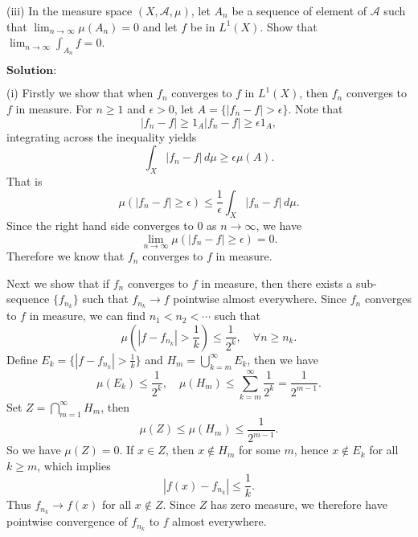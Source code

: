 \documentclass[12pt,a4paper]{ctexart}
\begin{document}
(iii) In the measure space $(X, \mathcal{A}, \mu)$, let $A_{n}$ be a sequence of element of $\mathcal{A}$ such that $\lim_{n \to \infty} \mu(A_{n}) = 0$ and let $f$ be in $L^{1}(X)$. Show that $\lim_{n \to \infty} \int_{A_{n}} f = 0$. 

\vspace{8pt}

$\textbf{Solution:}$

(i) Firstly we show that when $f_{n}$ converges to $f$ in $L^{1}(X)$, then $f_{n}$ converges to $f$ in measure. For $n \geq 1$ and $\epsilon > 0$, let $A = \{|f_{n} - f| > \epsilon \}$. Note that
\begin{equation*}
    |f_{n} - f| \geq 1_{A}  |f_{n} - f| \geq \epsilon 1_{A},
\end{equation*}
integrating across the inequality yields
\begin{equation*}
    \int_{X} |f_{n} - f| \, d \mu \geq \epsilon \mu(A) .
\end{equation*}
That is
\begin{equation*}
    \mu(|f_{n} - f| \geq \epsilon) \leq \frac{1}{\epsilon} \int_{X} |f_{n} - f| \, d \mu.
\end{equation*}
Since the right hand side converges to $0$ as $n \to \infty$, we have
\begin{equation*}
    \lim_{n \to \infty} \mu(|f_{n} - f| \geq \epsilon) = 0.
\end{equation*}
Therefore we know that $f_{n}$ converges to $f$ in measure. 

Next we show that if $f_{n}$ converges to $f$ in measure, then there exists a sub-sequence $\{f_{n_{k}}\}$ such that $f_{n_{k}} \to f$ pointwise almost everywhere. Since $f_{n}$ converges to $f$ in measure, we can find $n_{1} < n_{2} < \cdots$ such that 
\begin{equation*}
    \mu(|f - f_{n_{k}}| > \frac{1}{k}) \leq \frac{1}{2^{k}}, \quad \forall n \geq n_{k}.
\end{equation*}
Define $E_{k} = \{|f - f_{n_{k}}| > \frac{1}{k}\}$ and $H_{m} = \bigcup_{k = m}^{\infty} E_{k}$, then we have
\begin{equation*}
    \mu(E_{k}) \leq \frac{1}{2^{k}}, \quad \mu(H_{m}) \leq \sum_{k = m}^{\infty} \frac{1}{2^{k}} = \frac{1}{2^{m-1}}.
\end{equation*}
Set $Z = \bigcap_{m = 1}^{\infty} H_{m}$, then
\begin{equation*}
    \mu(Z) \leq \mu(H_{m}) \leq \frac{1}{2^{m-1}}.
\end{equation*}
So we have $\mu(Z) = 0$. If $x \in Z$, then $x \notin H_{m}$ for some $m$, hence $x \notin E_{k}$ for all $k \geq m$, which implies
\begin{equation*}
    |f(x) - f_{n_{k}}| \leq \frac{1}{k}.
\end{equation*}
Thus $f_{n_{k}} \to f(x)$ for all $x \notin Z$. Since $Z$ has zero measure, we therefore have pointwise convergence of $f_{n_{k}}$ to $f$ almost everywhere. 
\end{document}
